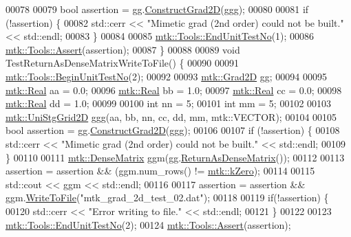 \begin{DoxyCode}
00078 
00079   \textcolor{keywordtype}{bool} assertion = gg.\hyperlink{classmtk_1_1Grad2D_a9771be954c59880e3d83f4d645378c00}{ConstructGrad2D}(ggg);
00080 
00081   \textcolor{keywordflow}{if} (!assertion) \{
00082     std::cerr << \textcolor{stringliteral}{"Mimetic grad (2nd order) could not be built."} << std::endl;
00083   \}
00084 
00085   \hyperlink{classmtk_1_1Tools_aba67d9dc35c9c1c49430fcc9ea035e03}{mtk::Tools::EndUnitTestNo}(1);
00086   \hyperlink{classmtk_1_1Tools_ac6804df469c94ab6a796fb64f1e44a89}{mtk::Tools::Assert}(assertion);
00087 \}
00088 
00089 \textcolor{keywordtype}{void} TestReturnAsDenseMatrixWriteToFile() \{
00090 
00091   \hyperlink{classmtk_1_1Tools_afc29ecaf337a13ed2e817d3890a5a441}{mtk::Tools::BeginUnitTestNo}(2);
00092 
00093   \hyperlink{classmtk_1_1Grad2D}{mtk::Grad2D} gg;
00094 
00095   \hyperlink{group__c01-roots_gac080bbbf5cbb5502c9f00405f894857d}{mtk::Real} aa = 0.0;
00096   \hyperlink{group__c01-roots_gac080bbbf5cbb5502c9f00405f894857d}{mtk::Real} bb = 1.0;
00097   \hyperlink{group__c01-roots_gac080bbbf5cbb5502c9f00405f894857d}{mtk::Real} cc = 0.0;
00098   \hyperlink{group__c01-roots_gac080bbbf5cbb5502c9f00405f894857d}{mtk::Real} dd = 1.0;
00099 
00100   \textcolor{keywordtype}{int} nn = 5;
00101   \textcolor{keywordtype}{int} mm = 5;
00102 
00103   \hyperlink{classmtk_1_1UniStgGrid2D}{mtk::UniStgGrid2D} ggg(aa, bb, nn, cc, dd, mm, mtk::VECTOR);
00104 
00105   \textcolor{keywordtype}{bool} assertion = gg.\hyperlink{classmtk_1_1Grad2D_a9771be954c59880e3d83f4d645378c00}{ConstructGrad2D}(ggg);
00106 
00107   \textcolor{keywordflow}{if} (!assertion) \{
00108     std::cerr << \textcolor{stringliteral}{"Mimetic grad (2nd order) could not be built."} << std::endl;
00109   \}
00110 
00111   \hyperlink{classmtk_1_1DenseMatrix}{mtk::DenseMatrix} ggm(gg.\hyperlink{classmtk_1_1Grad2D_a4f5a17519455f833bb70b8434c272312}{ReturnAsDenseMatrix}());
00112 
00113   assertion = assertion && (ggm.num\_rows() != \hyperlink{group__c01-roots_ga59a451a5fae30d59649bcda274fea271}{mtk::kZero});
00114 
00115   std::cout << ggm << std::endl;
00116 
00117   assertion = assertion && ggm.\hyperlink{classmtk_1_1DenseMatrix_ab396804fb5f188e1eaa8578c738c59fc}{WriteToFile}(\textcolor{stringliteral}{"mtk\_grad\_2d\_test\_02.dat"});
00118 
00119   \textcolor{keywordflow}{if}(!assertion) \{
00120     std::cerr << \textcolor{stringliteral}{"Error writing to file."} << std::endl;
00121   \}
00122 
00123   \hyperlink{classmtk_1_1Tools_aba67d9dc35c9c1c49430fcc9ea035e03}{mtk::Tools::EndUnitTestNo}(2);
00124   \hyperlink{classmtk_1_1Tools_ac6804df469c94ab6a796fb64f1e44a89}{mtk::Tools::Assert}(assertion);

\end{DoxyCode}
